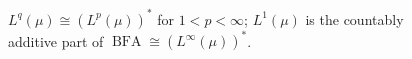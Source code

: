 \documentclass[a4paper]{article}
\begin{document}
\thispagestyle{empty}
\begin{figure}[H]
  \centering
  
  \caption{$L^q(\mu)\cong(L^p(\mu))^*$ for $1<p<\infty$; $L^1(\mu)$ is the countably additive part of $\operatorname{BFA}\cong(L^\infty(\mu))^*$.}
\end{figure}
\end{document}
